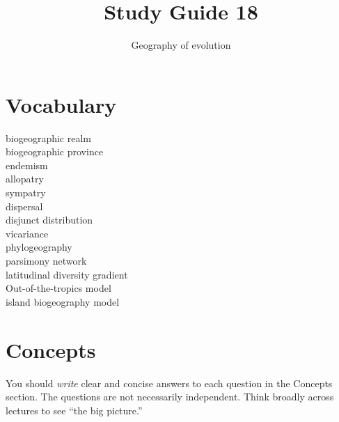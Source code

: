 \documentclass[letterpaper]{tufte-handout}
\title{Study Guide 18\hfill}
\author{Geography of evolution}
\date{} %
\begin{document}
\maketitle	%

\section{Vocabulary}

\begin{multicols}{2}
biogeographic realm \\
biogeographic province \\
endemism \\
allopatry \\
sympatry \\
dispersal \\
disjunct distribution \\
vicariance \\
phylogeography \\
parsimony network \\
latitudinal diversity gradient \\
Out-of-the-tropics model \\
island biogeography model
\end{multicols}


\section{Concepts}

You should \emph{write} clear and concise answers to each question in the Concepts section.  The questions are not necessarily independent.  Think broadly across lectures to see ``the big picture.'' 
\end{document}
